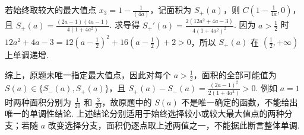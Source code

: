 \begin{solution}
\begin{enumerate}
若始终取较大的最大值点 \(x_3=1-\frac{1}{(4a)}\)，记面积为 \(S_+(a)\)，则 \(C\left(1-\frac1{4a},0\right)\)，且 \(S_+(a)=\frac{(2a-1)(4a-1)}{4(1+4a^2)}\). 求导得 \(S_+'(a)=\frac{2(12a^2+4a-3)}{4(1+4a^2)^2}\). 因为 \(a>\frac{1}{2}\) 时 \(12a^2+4a-3=12(a-\frac{1}{2})^2+16(a-\frac{1}{2})+2>0\)，所以 \(S_+(a)\) 在 \((\frac{1}{2},+\infty)\) 上单调递增.

综上，原题未唯一指定最大值点，因此对每个 \(a>\frac{1}{2}\)，面积的全部可能值为 \(S(a)\in\{S_-(a),S_+(a)\}\)，且 \(S_+(a)-S_-(a)=\frac{(2a-1)^2}{2(1+4a^2)}>0\). 例如 \(a=1\) 时两种面积分别为 \(\frac{1}{20}\) 和 \(\frac{3}{20}\)，故原题中的 \(S(a)\) 不是唯一确定的函数，不能给出唯一的单调性结论. 上述结论分别适用于始终选择较小或较大最大值点的两种分支；若随 \(a\) 改变选择分支，面积仍逐点取上述两值之一，不能据此断言整体单调.
\end{enumerate}
\end{solution}

